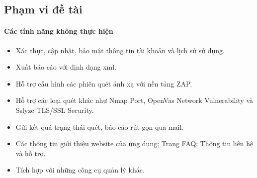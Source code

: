 \subsection*{Phạm vi đề tài}
\paragraph{Các tính năng không thực hiện}
\begin{itemize}
    \item Xác thực, cập nhật, bảo mật thông tin tài khoản và lịch sử sử dụng.
    \item Xuất báo cáo với định dạng xml.
    \item Hỗ trợ cấu hình các phiên quét ánh xạ với nền tảng ZAP.
    \item Hỗ trợ các loại quét khác như Nmap Port, OpenVas Network Vulnerability và Sslyze TLS/SSL Security.
    \item Gửi kết quả trạng thái quét, báo cáo rút gọn qua mail.
    \item Các thông tin giới thiệu website của ứng dụng; Trang FAQ; Thông tin liên hệ và hỗ trợ.
    \item Tích hợp với những công cụ quản lý khác.
\end{itemize}